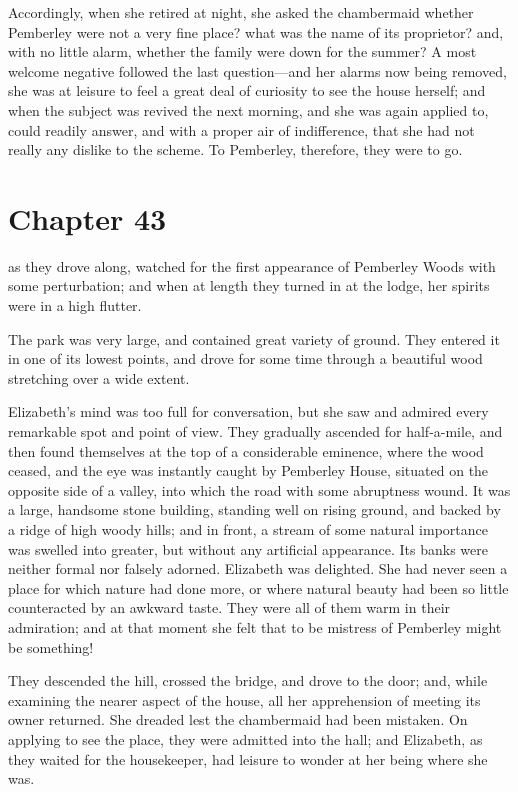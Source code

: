 Accordingly, when she retired at night, she asked the chambermaid
whether Pemberley were not a very fine place? what was the name
of its proprietor? and, with no little alarm, whether the family
were down for the summer?  A most welcome negative followed the
last question---and her alarms now being removed, she was at
leisure to feel a great deal of curiosity to see the house herself;
and when the subject was revived the next morning, and she was
again applied to, could readily answer, and with a proper air of
indifference, that she had not really any dislike to the scheme.
To Pemberley, therefore, they were to go.



\chapter{Chapter 43}


 as they drove along, watched for the first appearance
of Pemberley Woods with some perturbation; and when at
length they turned in at the lodge, her spirits were in a high
flutter.

The park was very large, and contained great variety of ground.
They entered it in one of its lowest points, and drove for some
time through a beautiful wood stretching over a wide extent.

Elizabeth's mind was too full for conversation, but she saw and
admired every remarkable spot and point of view.  They
gradually ascended for half-a-mile, and then found themselves
at the top of a considerable eminence, where the wood ceased,
and the eye was instantly caught by Pemberley House, situated
on the opposite side of a valley, into which the road with some
abruptness wound.  It was a large, handsome stone building,
standing well on rising ground, and backed by a ridge of high
woody hills; and in front, a stream of some natural importance
was swelled into greater, but without any artificial appearance.
Its banks were neither formal nor falsely adorned.  Elizabeth
was delighted.  She had never seen a place for which nature
had done more, or where natural beauty had been so little
counteracted by an awkward taste.  They were all of them warm
in their admiration; and at that moment she felt that to be
mistress of Pemberley might be something!

They descended the hill, crossed the bridge, and drove to the
door; and, while examining the nearer aspect of the house, all
her apprehension of meeting its owner returned.  She dreaded
lest the chambermaid had been mistaken.  On applying to see
the place, they were admitted into the hall; and Elizabeth, as
they waited for the housekeeper, had leisure to wonder at her
being where she was.

